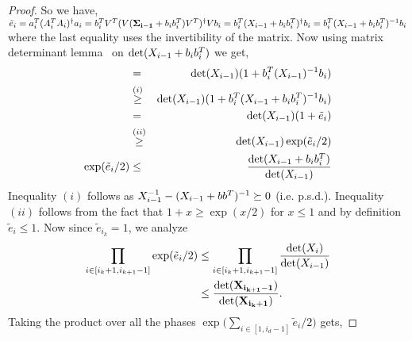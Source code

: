 \begin{proof}{\label{proof:onlineSummationBound}}
So we have, $\tilde{e}_{i} = \*a_{i}^T(\*A_{i}^T \*A_{i} )^{\dagger}\*a_{i} = \*b_{i}^T\*V^T(\*V(\mathbf{\Sigma_{i-1}}+\*b_{i} \*b_{i}^T)\*V^T)^{\dagger}\*V \*b_{i}=  \*b_{i}^T(\*X_{i-1}+\*b_{i}\*b_{i}^T)^{\dagger}\*b_{i} = \*b_{i}^T(\*X_{i-1}+\*b_{i}\*b_{i}^T)^{-1}\*b_{i}$
where the last equality uses the invertibility of the matrix. 
%  
 Now using matrix determinant lemma~\cite{vrabel2016note} on
 $\mbox{det}(\*X_{i-1}+\*b_{i}\*b_{i}^T)$ we get,
 \begin{eqnarray*}
  &=& \mbox{det}(\*X_{i-1})(1+\*b_{i}^T(\*X_{i-1})^{-1}\*b_{i}) \nonumber \\
  &\stackrel{(i)}{\geq}& \mbox{det}(\*X_{i-1})(1+\*b_{i}^T(\*X_{i-1}+\*b_{i} \*b_{i}^T)^{-1}\*b_{i}) \nonumber \\
  &=& \mbox{det}(\*X_{i-1})(1+\tilde{e}_{i}) \nonumber \\
  &\stackrel{(ii)}{\geq}& \mbox{det}(\*X_{i-1})\exp(\tilde{e}_{i}/2) \nonumber \\
  \exp(\tilde{e}_{i}/2) &\leq& \frac{\mbox{det}(\*X_{i-1}+\*b_{i}\*b_{i}^T)}{\mbox{det}(\*X_{i-1})} \nonumber
 \end{eqnarray*}
 Inequality $(i)$ follows as $\*X_{i-1}^{-1} - (\*X_{i-1} + \*b\*b^T)^{-1}\succeq 0$ (i.e. p.s.d.). Inequality $(ii)$ follows from
 the fact that $1+x \ge \exp(x/2)$ for $x \leq 1$ and by definition $\tilde{e}_{i} \leq 1$. Now since $\tilde{e}_{i_k} =1$, we analyze
 \begin{align*}
     \prod_{i\in[i_k+1, i_{k+1}-1]} \exp(\tilde{e}_{i}/2)  &\le  \prod_{i\in[i_k+1, i_{k+1}-1]}  \frac{\mbox{det}(\*X_{i})}{\mbox{det}(\*X_{i-1})}\\ &\le \frac{\mbox{det}(\mathbf{X_{i_{k+1}-1}})}{\mbox{det}(\mathbf{X_{i_k+1}})}.
 \end{align*}
 Taking the product over all the phases $\exp\bigg(\sum_{i\in [1, i_{d}-1]} \tilde{e}_{i}/2\bigg)$ gets,

\end{proof}
